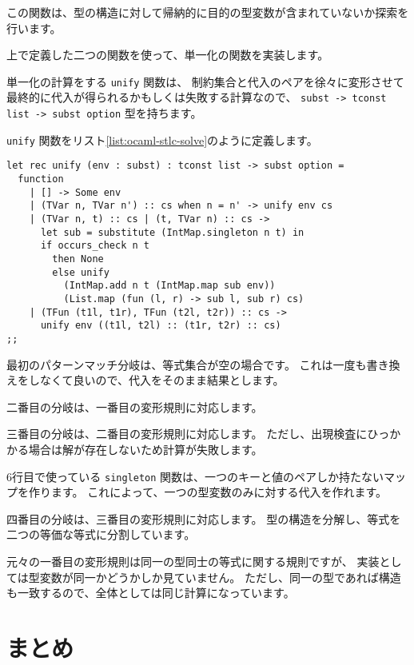 この関数は、型の構造に対して帰納的に目的の型変数が含まれていないか探索を行います。

上で定義した二つの関数を使って、単一化の関数を実装します。

単一化の計算をする \texttt{unify} 関数は、
制約集合と代入のペアを徐々に変形させて最終的に代入が得られるかもしくは失敗する計算なので、
\texttt{subst -> tconst list -> subst option} 型を持ちます。

\texttt{unify} 関数をリスト\ref{list:ocaml-stlc-solve}のように定義します。

\begin{lstlisting}[caption=方程式を解く関数, label=list:ocaml-stlc-solve]
let rec unify (env : subst) : tconst list -> subst option =
  function
    | [] -> Some env
    | (TVar n, TVar n') :: cs when n = n' -> unify env cs
    | (TVar n, t) :: cs | (t, TVar n) :: cs ->
      let sub = substitute (IntMap.singleton n t) in
      if occurs_check n t
        then None
        else unify
          (IntMap.add n t (IntMap.map sub env))
          (List.map (fun (l, r) -> sub l, sub r) cs)
    | (TFun (t1l, t1r), TFun (t2l, t2r)) :: cs ->
      unify env ((t1l, t2l) :: (t1r, t2r) :: cs)
;;
\end{lstlisting}

最初のパターンマッチ分岐は、等式集合が空の場合です。
これは一度も書き換えをしなくて良いので、代入をそのまま結果とします。

二番目の分岐は、一番目の変形規則に対応します。

三番目の分岐は、二番目の変形規則に対応します。
ただし、出現検査にひっかかる場合は解が存在しないため計算が失敗します。

6行目で使っている \texttt{singleton} 関数は、一つのキーと値のペアしか持たないマップを作ります。
これによって、一つの型変数のみに対する代入を作れます。

四番目の分岐は、三番目の変形規則に対応します。
型の構造を分解し、等式を二つの等価な等式に分割しています。

元々の一番目の変形規則は同一の型同士の等式に関する規則ですが、
実装としては型変数が同一かどうかしか見ていません。
ただし、同一の型であれば構造も一致するので、全体としては同じ計算になっています。

\section{まとめ}



